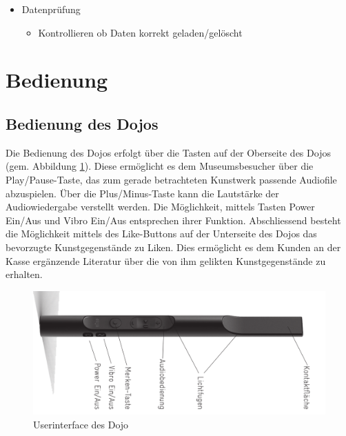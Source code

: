 \documentclass[10pt,a4paper,oneside]{99_fhnwreport}
\begin{document}
\begin{itemize}
	\item{Datenprüfung}
	\begin{itemize}
		\item{Kontrollieren ob Daten korrekt geladen/gelöscht}
	\end{itemize}
\end{itemize}

\section{Bedienung}\label{sec:bedienung}
\subsection{Bedienung des Dojos}
Die Bedienung des Dojos erfolgt über die Tasten auf der Oberseite des Dojos (gem. Abbildung \ref{fig:dojointerface}). Diese ermöglicht es dem Museumsbesucher über die Play/Pause-Taste, das zum gerade betrachteten Kunstwerk passende Audiofile abzuspielen. Über die Plus/Minus-Taste kann die Lautstärke der Audiowiedergabe verstellt werden. Die Möglichkeit, mittels Tasten Power Ein/Aus und Vibro Ein/Aus entsprechen ihrer Funktion. Abschliessend besteht die Möglichkeit mittels des Like-Buttons auf der Unterseite des Dojos das bevorzugte Kunstgegenstände zu Liken. Dies ermöglicht es dem Kunden an der Kasse ergänzende Literatur über die von ihm gelikten Kunstgegenstände zu erhalten.

\begin{figure}[htb]
\includegraphics[width=\textwidth]{dojointerface.png}
\caption{Userinterface des Dojo \cite{DOJO}} %
\label{fig:dojointerface}
\end{figure}
\end{document}
